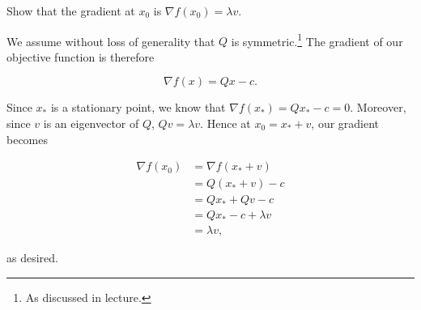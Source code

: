 Show that the gradient at $x_0$ is $\nabla f(x_0) = \lambda v$.


\begin{solution}
    We assume without loss of generality that $Q$ is symmetric.\footnote{
        As discussed in lecture.
    } The gradient of our objective function is therefore

    $$
    \nabla f(x) = Q x - c.
    $$

    Since $x_*$ is a stationary point, we know that $\nabla f(x_*) = Q x_* - c = 0$. Moreover, since $v$ is an 
    eigenvector of $Q$, $Q v = \lambda v$. Hence at $x_0 = x_* + v$, our gradient becomes

    \begin{align*}
        \nabla f(x_0) &= \nabla f(x_* + v) \\
        &= Q (x_* + v) - c \\
        &= Q x_* + Q v - c \\
        &= Q x_* - c + \lambda v \\
        &= \lambda v,
    \end{align*}

    as desired.
    \ \\
\end{solution}